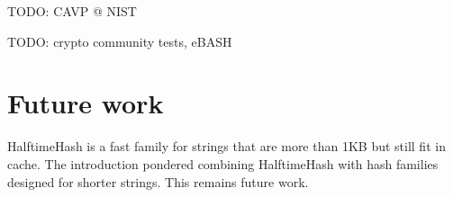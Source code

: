\documentclass[sigconf, nonacm]{acmart}
\begin{document}





TODO: CAVP @ NIST

TODO: crypto community tests, eBASH

\section{Future work}

HalftimeHash is a fast family for strings that are more than 1KB but still fit in cache.
The introduction pondered combining HalftimeHash with hash families designed for shorter strings.
This remains future work.
\end{document}
